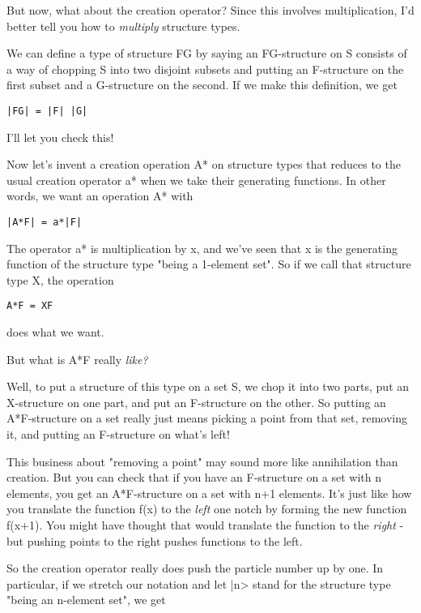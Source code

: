 But now, what about the creation operator?  Since this involves
multiplication, I'd better tell you how to \emph{multiply} structure types.

We can define a type of structure FG by saying an FG-structure on S
consists of a way of chopping S into two disjoint subsets and putting an
F-structure on the first subset and a G-structure on the second.  If we
make this definition, we get

\begin{verbatim}
|FG| = |F| |G|
\end{verbatim}
    
I'll let you check this!

Now let's invent a creation operation A* on structure types that reduces
to the usual creation operator a* when we take their generating
functions.  In other words, we want an operation A* with 

\begin{verbatim}
|A*F| = a*|F|
\end{verbatim}
    
The operator a* is multiplication by x, and we've seen that x is the
generating function of the structure type "being a 1-element set".   
So if we call that structure type X, the operation

\begin{verbatim}
A*F = XF
\end{verbatim}
    
does what we want.

But what is A*F really \emph{like?}

Well, to put a structure of this type on a set S, we chop it into two
parts, put an X-structure on one part, and put an F-structure on the
other.  So putting an A*F-structure on a set really just means picking 
a point from that set, removing it, and putting an F-structure on what's
left!

This business about "removing a point" may sound more like
annihilation than creation.  But you can check that if you have an
F-structure on a set with n elements, you get an A*F-structure on a set
with n+1 elements. It's just like how you translate the function f(x) to
the \emph{left} one notch by forming the new function f(x+1).  You might have
thought that would translate the function to the \emph{right} - but pushing
points to the right pushes functions to the left.

So the creation operator really does push the particle number up by one.
In  particular, if we stretch our notation and let |n> stand for the
structure type "being an n-element set", we get

